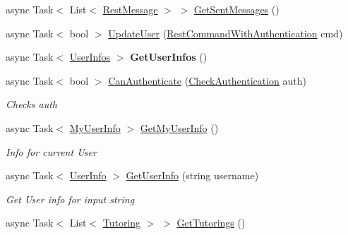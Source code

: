 \begin{DoxyCompactItemize}
async Task$<$ List$<$ \mbox{\hyperlink{class_tutor_scout24_1_1_models_1_1_chat_1_1_rest_message}{Rest\+Message}} $>$ $>$ \mbox{\hyperlink{class_tutor_scout24_1_1_services_1_1_tutor_scout_rest_service_a1efcdc1fe62961a72d354f4fe5170d18}{Get\+Sent\+Messages}} ()
\item 
async Task$<$ bool $>$ \mbox{\hyperlink{class_tutor_scout24_1_1_services_1_1_tutor_scout_rest_service_a6f94210e708fe30a18c712db702d13d9}{Update\+User}} (\mbox{\hyperlink{class_tutor_scout24_1_1_models_1_1_rest_command_with_authentication}{Rest\+Command\+With\+Authentication}} cmd)
\item 
\mbox{\label{class_tutor_scout24_1_1_services_1_1_tutor_scout_rest_service_a42b608e3ef3bb174d1a101e4b36046c3}} 
async Task$<$ \mbox{\hyperlink{class_tutor_scout24_1_1_models_1_1_user_data_1_1_user_infos}{User\+Infos}} $>$ {\bfseries Get\+User\+Infos} ()
\item 
async Task$<$ bool $>$ \mbox{\hyperlink{class_tutor_scout24_1_1_services_1_1_tutor_scout_rest_service_ad896af0129cadfceb66a35932bed7086}{Can\+Authenticate}} (\mbox{\hyperlink{class_tutor_scout24_1_1_models_1_1_user_data_1_1_check_authentication}{Check\+Authentication}} auth)
\begin{DoxyCompactList}\small\item\em Checks auth \end{DoxyCompactList}\item 
async Task$<$ \mbox{\hyperlink{class_tutor_scout24_1_1_models_1_1_user_data_1_1_my_user_info}{My\+User\+Info}} $>$ \mbox{\hyperlink{class_tutor_scout24_1_1_services_1_1_tutor_scout_rest_service_a4a4407306592193566c761cb66332bb5}{Get\+My\+User\+Info}} ()
\begin{DoxyCompactList}\small\item\em Info for current User \end{DoxyCompactList}\item 
async Task$<$ \mbox{\hyperlink{class_tutor_scout24_1_1_models_1_1_user_data_1_1_user_info}{User\+Info}} $>$ \mbox{\hyperlink{class_tutor_scout24_1_1_services_1_1_tutor_scout_rest_service_a0a9cee645967c8be7d723b29778fafae}{Get\+User\+Info}} (string username)
\begin{DoxyCompactList}\small\item\em Get User info for input string \end{DoxyCompactList}\item 
async Task$<$ List$<$ \mbox{\hyperlink{class_tutor_scout24_1_1_models_1_1_tutorings_1_1_tutoring}{Tutoring}} $>$ $>$ \mbox{\hyperlink{class_tutor_scout24_1_1_services_1_1_tutor_scout_rest_service_a6324b2d5d4b9a9fe5dd7592417e8917c}{Get\+Tutorings}} ()

\end{DoxyCompactItemize}
